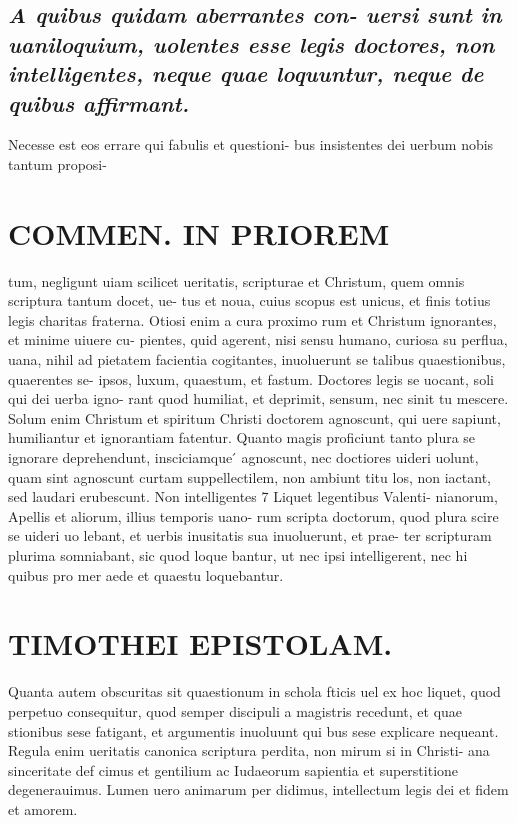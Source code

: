\documentclass{article}
\begin{document}
\begin{pages}
\subsection*{\textit{A quibus quidam aberrantes con- uersi sunt in uaniloquium, uolentes esse legis doctores, non intelligentes, neque quae loquuntur, neque de quibus affirmant. }}\pstart Necesse est eos errare qui fabulis et questioni- bus insistentes dei uerbum nobis tantum proposi-  \pend
\section*{COMMEN. IN PRIOREM }
\marginpar{[ p.16 ]}\pstart tum, negligunt uiam scilicet ueritatis, scripturae et Christum, quem omnis scriptura tantum docet, ue- tus et noua, cuius scopus est unicus, et finis totius legis charitas fraterna. Otiosi enim a cura proximo rum et Christum ignorantes, et minime uiuere cu- pientes, quid agerent, nisi sensu humano, curiosa su perflua, uana, nihil ad pietatem facientia cogitantes, inuoluerunt se talibus quaestionibus, quaerentes se- ipsos, luxum, quaestum, et fastum.  \pend\pstart Doctores legis se uocant, soli qui dei uerba igno- rant quod humiliat, et deprimit, sensum, nec sinit tu mescere. Solum enim Christum et spiritum Christi doctorem agnoscunt, qui uere sapiunt, humiliantur et ignorantiam fatentur. Quanto magis proficiunt tanto plura se ignorare deprehendunt, insciciamque ́ agnoscunt, nec doctiores uideri uolunt, quam sint agnoscunt curtam suppellectilem, non ambiunt titu los, non iactant, sed laudari erubescunt.  \pend\pstart Non intelligentes 7 Liquet legentibus Valenti- nianorum, Apellis et aliorum, illius temporis uano- rum scripta doctorum, quod plura scire se uideri uo lebant, et uerbis inusitatis sua inuoluerunt, et prae- ter scripturam plurima somniabant, sic quod loque bantur, ut nec ipsi intelligerent, nec hi quibus pro mer aede et quaestu loquebantur.  \pend
\section*{TIMOTHEI EPISTOLAM. }
\marginpar{[ p.17 ]}\pstart Quanta autem obscuritas sit quaestionum in schola fticis uel ex hoc liquet, quod perpetuo consequitur, quod semper discipuli a magistris recedunt, et quae stionibus sese fatigant, et argumentis inuoluunt qui bus sese explicare nequeant. Regula enim ueritatis canonica scriptura perdita, non mirum si in Christi- ana sinceritate def cimus et gentilium ac Iudaeorum sapientia et superstitione degenerauimus. Lumen uero animarum per didimus, intellectum legis dei et fidem et amorem.  \pend
{}
{}

\end{pages}
\end{document}
